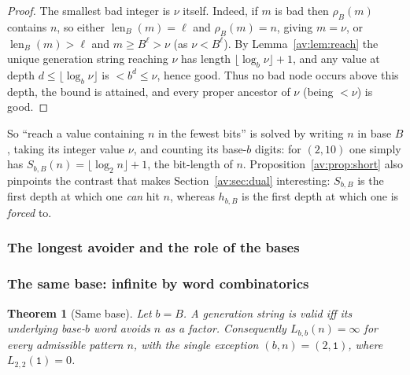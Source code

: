 \documentclass[a4paper]{article}
\theoremstyle{plain}
\newtheorem{theorem}{Theorem}[subsection]
\theoremstyle{definition}
\theoremstyle{remark}
\DeclareMathOperator{\len}{len}
\newcommand{\Lbb}[1][b,B]{L_{#1}}
\newcommand{\Sbb}[1][b,B]{S_{#1}}
\newcommand{\hbb}[1][b,B]{h_{#1}}
\begin{document}
\begin{proof}
The smallest bad integer is $\nu$ itself. Indeed, if $m$ is bad then $\rho_B(m)$ contains $n$, so either $\len_B(m)=\ell$ and $\rho_B(m)=n$, giving $m=\nu$, or $\len_B(m)>\ell$ and $m\ge B^{\ell}>\nu$ (as $\nu<B^{\ell}$). By Lemma~\ref{av:lem:reach} the unique generation string reaching $\nu$ has length $\lfloor\log_b\nu\rfloor+1$, and any value at depth $d\le \lfloor\log_b\nu\rfloor$ is $<b^{d}\le\nu$, hence good. Thus no bad node occurs above this depth, the bound is attained, and every proper ancestor of $\nu$ (being $<\nu$) is good.
\end{proof}

So ``reach a value containing $n$ in the fewest bits'' is solved by writing $n$ in base $B$, taking its integer value $\nu$, and counting its base-$b$ digits: for $(2,10)$ one simply has $\Sbb(n)=\lfloor\log_2 n\rfloor+1$, the bit-length of $n$. Proposition~\ref{av:prop:short} also pinpoints the contrast that makes Section~\ref{av:sec:dual} interesting: $\Sbb$ is the first depth at which one \emph{can} hit $n$, whereas $\hbb$ is the first depth at which one is \emph{forced} to.

\subsubsection{The longest avoider and the role of the bases}

\subsubsection{The same base: infinite by word combinatorics}

\begin{theorem}[Same base]\label{av:thm:same}
Let $b=B$. A generation string is valid iff its underlying base-$b$ word avoids $n$ as a factor. Consequently $\Lbb[b,b](n)=\infty$ for every admissible pattern $n$, with the single exception $(b,n)=(2,\texttt{1})$, where $\Lbb[2,2](\texttt{1})=0$.
\end{theorem}
\end{document}
